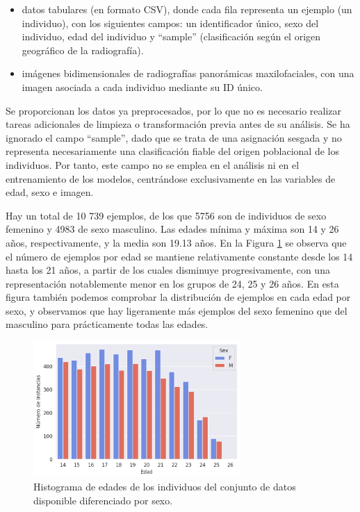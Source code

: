 \begin{itemize}

    \item datos tabulares (en formato CSV), donde cada fila representa un ejemplo (un individuo), con los siguientes campos: un identificador único, sexo del individuo, edad del individuo y ``sample'' (clasificación según el origen geográfico de la radiografía).

    \item imágenes bidimensionales de radiografías panorámicas maxilofaciales, con una imagen asociada a cada individuo mediante su ID único. 

\end{itemize}

Se proporcionan los datos ya preprocesados, por lo que no es necesario realizar tareas adicionales de limpieza o transformación previa antes de su análisis. Se ha ignorado el campo ``sample'', dado que se trata de una asignación sesgada y no representa necesariamente una clasificación fiable del origen poblacional de los individuos. Por tanto, este campo no se emplea en el análisis ni en el entrenamiento de los modelos, centrándose exclusivamente en las variables de edad, sexo e imagen.

Hay un total de 10 739 ejemplos, de los que 5756 son de individuos de sexo femenino y 4983 de sexo masculino. Las edades mínima y máxima son 14 y 26 años, respectivamente, y la media son 19.13 años. 
En la Figura \ref{fig:histogram_ages_sex} se observa que el número de ejemplos por edad se mantiene relativamente constante desde los 14 hasta los 21 años, a partir de los cuales disminuye progresivamente, con una representación notablemente menor en los grupos de 24, 25 y 26 años.
En esta figura también podemos comprobar la distribución de ejemplos en cada edad por sexo, y observamos que hay ligeramente más ejemplos del sexo femenino que del masculino para prácticamente todas las edades.

\begin{figure}[H]
    \centering
    \includegraphics[width=0.7\textwidth]{capitulos/cap_04/imagenes/histogram_by_age_and_sex.png}
    \caption[
        Histograma de edades de los individuos del conjunto de datos disponible diferenciado por sexo.
    ]{
        Histograma de edades de los individuos del conjunto de datos disponible diferenciado por sexo. 
    } 
    \label{fig:histogram_ages_sex}
\end{figure}

